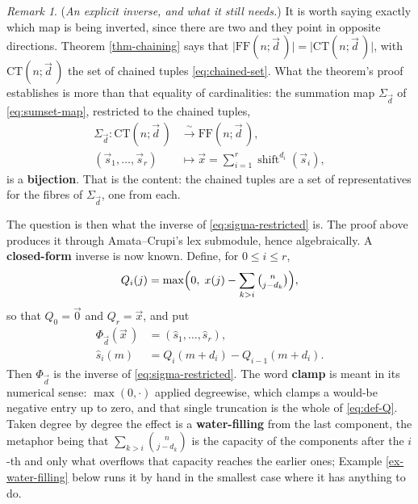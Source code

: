 \documentclass[11pt, a4paper, abstract=yes]{scrartcl}
\theoremstyle{definition}
\theoremstyle{remark}
\newtheorem{remark}[definition]{Remark}
\theoremstyle{plain}
\newcommand{\shift}{\operatorname{shift}}
\begin{document}
\begin{remark}
(\emph{An explicit inverse, and what it still needs.}) It is worth saying exactly which map is being
inverted, since there are two and they point in opposite directions. Theorem \ref{thm-chaining} says
that \(\lvert\mathrm{FF}(n;\vec d\,)\rvert=\lvert\mathrm{CT}(n;\vec d\,)\rvert\), with
\(\mathrm{CT}(n;\vec d\,)\) the set of chained tuples \eqref{eq:chained-set}. What the theorem's proof
establishes is more than that equality of cardinalities: the summation map \(\Sigma_{\vec d}\) of
\eqref{eq:sumset-map}, restricted to the chained tuples,
\begin{equation}\label{eq:sigma-restricted}
\begin{split}
  \Sigma_{\vec d}\colon\mathrm{CT}(n;\vec d\,) &\xrightarrow{\ \sim\ } \mathrm{FF}(n;\vec d\,),\\
  (\vec s_1,\dots,\vec s_r) &\longmapsto \vec x=\sum_{i=1}^{r}\shift^{d_i}(\vec s_i),
\end{split}
\end{equation}
is a \textbf{bijection}. That is the content: the chained tuples are a set of representatives for the fibres
of \(\Sigma_{\vec d}\), one from each.

The question is then what the inverse of \eqref{eq:sigma-restricted} is. The proof above produces it
through Amata--Crupi's lex submodule, hence algebraically. A \textbf{closed-form} inverse is now known.
Define, for \(0\le i\le r\),
\begin{equation}\label{eq:def-Q}
  Q_i(j)=\max\Bigl(0,\;x(j)-\sum_{k>i}\tbinom n{j-d_k}\Bigr) ,
\end{equation}
so that \(Q_0=\vec 0\) and \(Q_r=\vec x\), and put
\begin{align}
  \Phi_{\vec d}(\vec x\,) &= (\hat s_1,\dots,\hat s_r),\label{eq:water-filling}\\
  \hat s_i(m) &= Q_i(m+d_i)-Q_{i-1}(m+d_i) .\label{eq:water-filling-component}
\end{align}
Then \(\Phi_{\vec d}\) is the inverse of \eqref{eq:sigma-restricted}. The word \textbf{clamp} is meant in its
numerical sense: \(\max(0,\cdot)\) applied degreewise, which clamps a would-be negative entry up to
zero, and that single truncation is the whole of \eqref{eq:def-Q}. Taken degree by degree the effect
is a \textbf{water-filling} from the last component, the metaphor being that \(\sum_{k>i}\binom n{j-d_k}\)
is the capacity of the components after the \(i\)-th and only what overflows that capacity reaches
the earlier ones; Example \ref{ex-water-filling} below runs it by hand in the smallest case where it
has anything to do.


\end{remark}
\end{document}

